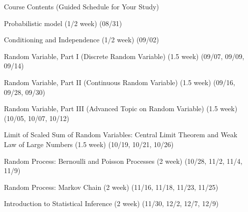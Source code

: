 \begin{frame}{Course Contents (Guided Schedule for Your Study)}

\plitemsep 0.02in


\small
\bce[1.] 

\item Probabilistic model (1/2 week) (08/31)

\item Conditioning and Independence (1/2 week) (09/02)

\item Random Variable, Part I (Discrete Random Variable) (1.5 week)
  (09/07, 09/09, 09/14)

\item[]  \hrulefill

\item Random Variable, Part II (Continuous Random Variable) (1.5 week)
  (09/16, 09/28, 09/30) 

\item Random Variable, Part III (Advanced Topic on Random Variable)
  (1.5 week) (10/05, 10/07, 10/12)

\item[]  \hrulefill

\item Limit of Scaled Sum of Random Variables: Central Limit Theorem
  and Weak Law of Large Numbers (1.5 week) (10/19, 10/21, 10/26)

\item Random Process: Bernoulli and Poisson Processes (2 week) (10/28,
  11/2, 11/4, 11/9)

\item[]  \hrulefill

\item Random Process: Markov Chain (2 week) (11/16, 11/18, 11/23, 11/25)

\item Introduction to Statistical Inference (2 week) (11/30, 12/2, 12/7,
  12/9)

\item[]  \hrulefill
  \ece

\end{frame}



